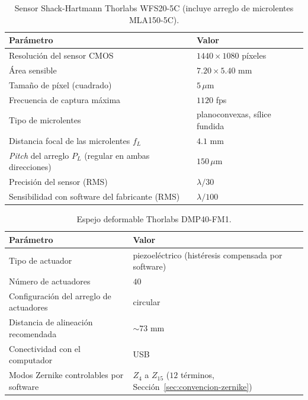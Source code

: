 \documentclass[letterpaper,12pt,oneside]{book}
\begin{document}
\begin{table}[htbp]
\centering
\caption{Sensor Shack-Hartmann Thorlabs WFS20-5C (incluye arreglo de microlentes MLA150-5C).}
\label{tab:ap-wfs}
\begin{tabularx}{\textwidth}{>{\raggedright\arraybackslash}X l}
\hline
\textbf{Parámetro} & \textbf{Valor} \\
\hline
Resolución del sensor CMOS & $1440 \times 1080$ píxeles \\
Área sensible & $7.20 \times 5.40$ mm \\
Tamaño de píxel (cuadrado) & $5\,\mu$m \\
Frecuencia de captura máxima & $1120$ fps \\
Tipo de microlentes & planoconvexas, sílice fundida \\
Distancia focal de las microlentes $f_L$ & $4.1$ mm \\
\textit{Pitch} del arreglo $P_L$ (regular en ambas direcciones) & $150\,\mu$m \\
Precisión del sensor (RMS) & $\lambda/30$ \\
Sensibilidad con software del fabricante (RMS) & $\lambda/100$ \\
\hline
\end{tabularx}
\end{table}

\begin{table}[htbp]
\centering
\caption{Espejo deformable Thorlabs DMP40-FM1.}
\label{tab:ap-dmp40}
\begin{tabularx}{\textwidth}{l >{\raggedright\arraybackslash}X}
\hline
\textbf{Parámetro} & \textbf{Valor} \\
\hline
Tipo de actuador & piezoeléctrico (histéresis compensada por software) \\
Número de actuadores & $40$ \\
Configuración del arreglo de actuadores & circular \\
Distancia de alineación recomendada & $\sim 73$ mm \\
Conectividad con el computador & USB \\
Modos Zernike controlables por software & $Z_4$ a $Z_{15}$ ($12$ términos, Sección~\ref{sec:convencion-zernike}) \\
\hline
\end{tabularx}
\end{table}
\end{document}
